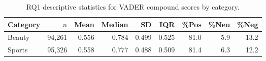 \begin{table}[h]
\centering
\caption{RQ1 descriptive statistics for VADER compound scores by category.}
\label{tab:rq1_descriptives}
\begin{tabular}{lrrrrrrrr}
\toprule
Category & $n$ & Mean & Median & SD & IQR & \%Pos & \%Neu & \%Neg \\
\midrule
Beauty & 94,261 & 0.556 & 0.784 & 0.499 & 0.525 & 81.0 & 5.9 & 13.2 \\
Sports & 95,326 & 0.558 & 0.777 & 0.488 & 0.509 & 81.4 & 6.3 & 12.2 \\
\bottomrule
\end{tabular}
\end{table}